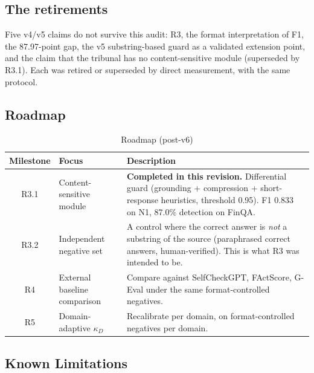 \documentclass[11pt,a4paper]{article}
\begin{document}
\subsection{The retirements}
Five v4/v5 claims do not survive this audit: R3, the format interpretation of F1, the 87.97-point gap, the v5 substring-based guard as a validated extension point, and the claim that the tribunal has no content-sensitive module (superseded by R3.1). Each was retired or superseded by direct measurement, with the same protocol.

\subsection{Roadmap}
\begin{table}[H]
\centering
\caption{Roadmap (post-v6)}
\label{tab:roadmap}
\begin{tabular}{@{}clp{8cm}@{}} 
\toprule
Milestone & Focus & Description \\
\midrule
R3.1 & Content-sensitive module & \textbf{Completed in this revision.} Differential guard (grounding + compression + short-response heuristics, threshold 0.95). F1 0.833 on N1, 87.0\% detection on FinQA. \\
R3.2 & Independent negative set & A control where the correct answer is \emph{not} a substring of the source (paraphrased correct answers, human-verified). This is what R3 was intended to be. \\
R4 & External baseline comparison & Compare against SelfCheckGPT, FActScore, G-Eval under the same format-controlled negatives. \\
R5 & Domain-adaptive $\kappa_D$ & Recalibrate per domain, on format-controlled negatives per domain. \\
\bottomrule
\end{tabular}
\end{table}

\subsection{Known Limitations}
\label{sec:known-limitations}
\end{document}
